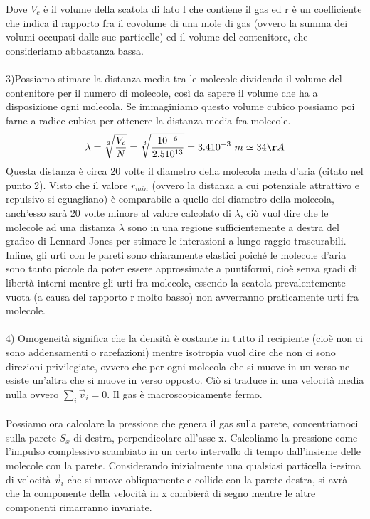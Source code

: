\documentclass[10pt,a4paper]{article}
\begin{document}
Dove $V_c$ è il volume della scatola di lato l che contiene il gas ed r è un coefficiente che indica il rapporto fra il covolume di una mole di gas (ovvero la summa dei volumi occupati dalle sue particelle) ed il volume del contenitore, che consideriamo abbastanza bassa. \\\\
3)Possiamo stimare la distanza media tra le molecole dividendo il volume del contenitore per il numero di molecole, così da sapere il volume che ha a disposizione ogni molecola. Se immaginiamo questo volume cubico possiamo poi farne a radice cubica per ottenere la distanza media fra molecole.
\begin{align*} 
	\lambda = \sqrt[3]{\frac{V_c}{N}} = \sqrt[3]{\frac{10^{-6}}{2.5 10^{13}}}= 3.4 10^{-3}\ m \simeq 34\AA
\end{align*} 
Questa distanza è circa 20 volte il diametro della molecola meda d'aria (citato nel punto 2). Visto che il valore $r_{min}$ (ovvero la distanza a cui potenziale attrattivo e repulsivo si eguagliano) è comparabile a quello del diametro della molecola, anch'esso sarà 20 volte minore al valore calcolato di $\lambda$, ciò vuol dire che le molecole ad una distanza $\lambda$ sono in una regione sufficientemente a destra del grafico di Lennard-Jones per stimare le interazioni a lungo raggio trascurabili. Infine, gli urti con le pareti sono chiaramente elastici poiché le molecole d'aria sono tanto piccole da poter essere approssimate a puntiformi, cioè senza gradi di libertà interni mentre gli urti fra molecole, essendo la scatola prevalentemente vuota (a causa del rapporto r molto basso) non avverranno praticamente urti fra molecole.\\\\
4) Omogeneità significa che la densità è costante in tutto il recipiente (cioè non ci sono addensamenti o rarefazioni) mentre isotropia vuol dire che non ci sono direzioni privilegiate, ovvero che per ogni molecola che si muove in un verso ne esiste un'altra che si muove in verso opposto. Ciò si traduce in una velocità media nulla ovvero $\sum_i \vec{v}_i = 0$. Il gas è macroscopicamente fermo.\\\\
Possiamo ora calcolare la pressione che genera il gas sulla parete, concentriamoci sulla parete $S_x$ di destra, perpendicolare all'asse x. Calcoliamo la pressione come l'impulso complessivo scambiato in un certo intervallo di tempo dall'insieme delle molecole con la parete. Considerando inizialmente una qualsiasi particella i-esima di velocità $\vec{v}_i$ che si muove obliquamente e collide con la parete destra, si avrà che la componente della velocità in x cambierà di segno mentre le altre componenti rimarranno invariate.
\end{document}
